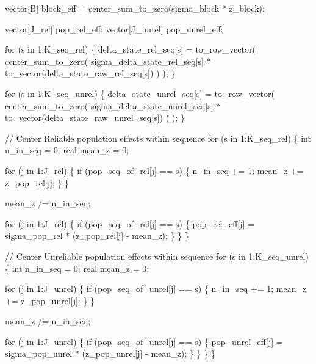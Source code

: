 \documentclass[
]{article}
\newenvironment{Shaded}{\begin{snugshade}}{\end{snugshade}}
\newcommand{\StringTok}[1]{\textcolor[rgb]{0.31,0.60,0.02}{#1}}
\begin{document}
\begin{Shaded}
\begin{Highlighting}[]
\StringTok{  vector[B] block\_eff = center\_sum\_to\_zero(sigma\_block * z\_block);}

\StringTok{  vector[J\_rel] pop\_rel\_eff;}
\StringTok{  vector[J\_unrel] pop\_unrel\_eff;}

\StringTok{  for (s in 1:K\_seq\_rel) \{}
\StringTok{    delta\_state\_rel\_seq[s] =}
\StringTok{      to\_row\_vector(}
\StringTok{        center\_sum\_to\_zero(}
\StringTok{          sigma\_delta\_state\_rel\_seq[s] * to\_vector(delta\_state\_raw\_rel\_seq[s])}
\StringTok{        )}
\StringTok{      );}
\StringTok{  \}}

\StringTok{  for (s in 1:K\_seq\_unrel) \{}
\StringTok{    delta\_state\_unrel\_seq[s] =}
\StringTok{      to\_row\_vector(}
\StringTok{        center\_sum\_to\_zero(}
\StringTok{          sigma\_delta\_state\_unrel\_seq[s] * to\_vector(delta\_state\_raw\_unrel\_seq[s])}
\StringTok{        )}
\StringTok{      );}
\StringTok{  \}}

\StringTok{  // Center Reliable population effects within sequence}
\StringTok{  for (s in 1:K\_seq\_rel) \{}
\StringTok{    int n\_in\_seq = 0;}
\StringTok{    real mean\_z = 0;}

\StringTok{    for (j in 1:J\_rel) \{}
\StringTok{      if (pop\_seq\_of\_rel[j] == s) \{}
\StringTok{        n\_in\_seq += 1;}
\StringTok{        mean\_z += z\_pop\_rel[j];}
\StringTok{      \}}
\StringTok{    \}}

\StringTok{    mean\_z /= n\_in\_seq;}

\StringTok{    for (j in 1:J\_rel) \{}
\StringTok{      if (pop\_seq\_of\_rel[j] == s) \{}
\StringTok{        pop\_rel\_eff[j] = sigma\_pop\_rel * (z\_pop\_rel[j] {-} mean\_z);}
\StringTok{      \}}
\StringTok{    \}}
\StringTok{  \}}

\StringTok{  // Center Unreliable population effects within sequence}
\StringTok{  for (s in 1:K\_seq\_unrel) \{}
\StringTok{    int n\_in\_seq = 0;}
\StringTok{    real mean\_z = 0;}

\StringTok{    for (j in 1:J\_unrel) \{}
\StringTok{      if (pop\_seq\_of\_unrel[j] == s) \{}
\StringTok{        n\_in\_seq += 1;}
\StringTok{        mean\_z += z\_pop\_unrel[j];}
\StringTok{      \}}
\StringTok{    \}}

\StringTok{    mean\_z /= n\_in\_seq;}

\StringTok{    for (j in 1:J\_unrel) \{}
\StringTok{      if (pop\_seq\_of\_unrel[j] == s) \{}
\StringTok{        pop\_unrel\_eff[j] = sigma\_pop\_unrel * (z\_pop\_unrel[j] {-} mean\_z);}
\StringTok{      \}}
\StringTok{    \}}
\StringTok{  \}}
\StringTok{\}}


\end{Highlighting}
\end{Shaded}
\end{document}
